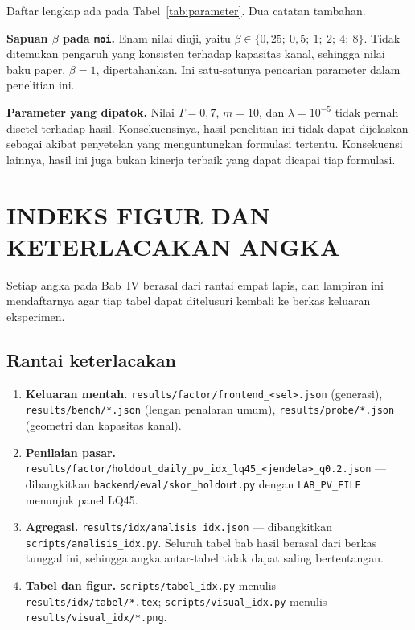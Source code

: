 \documentclass{laporanta1statugm}
\newcommand{\code}[1]{\texttt{#1}}
\begin{document}
Daftar lengkap ada pada Tabel~\ref{tab:parameter}. Dua catatan tambahan.

\textbf{Sapuan $\beta$ pada \code{moi}.} Enam nilai diuji, yaitu
$\beta\in\{0{,}25;\ 0{,}5;\ 1;\ 2;\ 4;\ 8\}$. Tidak ditemukan pengaruh yang
konsisten terhadap kapasitas kanal, sehingga nilai baku paper, $\beta = 1$,
dipertahankan. Ini satu-satunya pencarian parameter dalam penelitian ini.

\textbf{Parameter yang dipatok.} Nilai $T = 0{,}7$, $m = 10$, dan
$\lambda = 10^{-5}$ tidak pernah disetel terhadap hasil. Konsekuensinya, hasil
penelitian ini tidak dapat dijelaskan sebagai akibat penyetelan yang
menguntungkan formulasi tertentu. Konsekuensi lainnya, hasil ini juga bukan
kinerja terbaik yang dapat dicapai tiap formulasi.

\chapter{INDEKS FIGUR DAN KETERLACAKAN ANGKA}

Setiap angka pada Bab~IV berasal dari rantai empat lapis, dan lampiran ini
mendaftarnya agar tiap tabel dapat ditelusuri kembali ke berkas keluaran
eksperimen.

\section{Rantai keterlacakan}

\begin{enumerate}
  \item \textbf{Keluaran mentah.} \code{results/factor/frontend\_<sel>.json}
        (generasi), \code{results/bench/*.json} (lengan penalaran umum),
        \code{results/probe/*.json} (geometri dan kapasitas kanal).
  \item \textbf{Penilaian pasar.}
        \code{results/factor/holdout\_daily\_pv\_idx\_lq45\_<jendela>\_q0.2.json}
        --- dibangkitkan \code{backend/eval/skor\_holdout.py} dengan
        \code{LAB\_PV\_FILE} menunjuk panel LQ45.
  \item \textbf{Agregasi.} \code{results/idx/analisis\_idx.json} ---
        dibangkitkan \code{scripts/analisis\_idx.py}. Seluruh tabel bab hasil
        berasal dari berkas tunggal ini, sehingga angka antar-tabel tidak dapat
        saling bertentangan.
  \item \textbf{Tabel dan figur.} \code{scripts/tabel\_idx.py} menulis
        \code{results/idx/tabel/*.tex}; \code{scripts/visual\_idx.py} menulis
        \code{results/visual\_idx/*.png}.
\end{enumerate}
\end{document}
